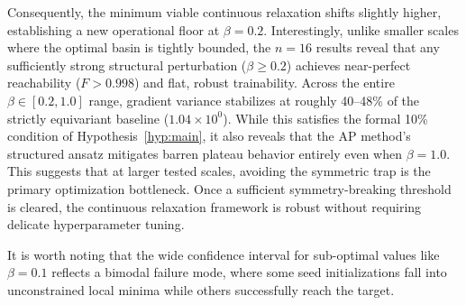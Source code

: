 \documentclass[pdflatex,sn-mathphys-num]{sn-jnl}
\theoremstyle{thmstyleone}
\theoremstyle{thmstyletwo}
\theoremstyle{thmstylethree}
\begin{document}
Consequently, the minimum viable continuous relaxation shifts slightly higher, establishing a new operational floor at $\beta = 0.2$. Interestingly, unlike smaller scales where the optimal basin is tightly bounded, the $n=16$ results reveal that any sufficiently strong structural perturbation ($\beta \ge 0.2$) achieves near-perfect reachability ($F > 0.998$) and flat, robust trainability. Across the entire $\beta \in [0.2, 1.0]$ range, gradient variance stabilizes at roughly 40--48\% of the strictly equivariant baseline ($1.04 \times 10^{0}$). While this satisfies the formal 10\% condition of Hypothesis~\ref{hyp:main}, it also reveals that the AP method's structured ansatz mitigates barren plateau behavior entirely even when $\beta=1.0$. This suggests that at larger tested scales, avoiding the symmetric trap is the primary optimization bottleneck. Once a sufficient symmetry-breaking threshold is cleared, the continuous relaxation framework is robust without requiring delicate hyperparameter tuning.


It is worth noting that the wide confidence interval for sub-optimal values like $\beta=0.1$ reflects a bimodal failure mode, where some seed initializations fall into unconstrained local minima while others successfully reach the target.
\end{document}
